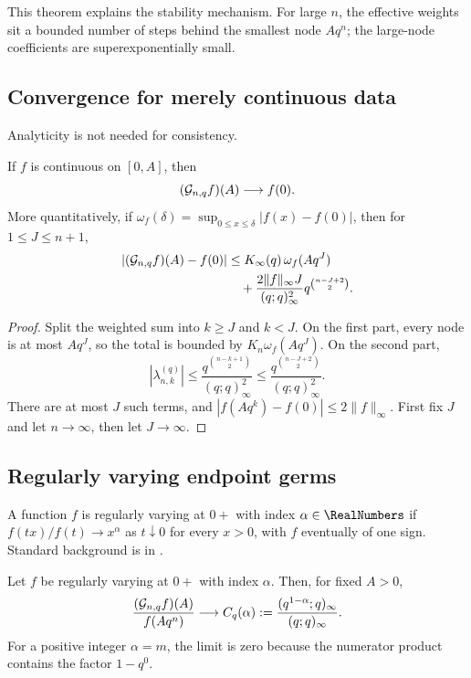 This theorem explains the stability mechanism.  For large $n$, the effective
weights sit a bounded number of steps behind the smallest node $Aq^n$; the
large-node coefficients are superexponentially small.

\subsection{Convergence for merely continuous data}

Analyticity is not needed for consistency.

\begin{theorem}
If $f$ is continuous on $[0,A]$, then
\begin{equation}
 (\mathcal G_{n,q}f)(A)\longrightarrow f(0).
 \label{g1:eq:continuous-convergence}
\end{equation}
More quantitatively, if
$\omega_f(\delta)=\sup_{0\le x\le\delta}|f(x)-f(0)|$, then for
$1\le J\le n+1$,
\begin{align}
 |(\mathcal G_{n,q}f)(A)-f(0)|
 &\le K_\infty(q)\,\omega_f(Aq^J)\notag\\
 &\quad+\frac{2\|f\|_\infty J}{(q;q)_\infty^2}
 q^{\binom{n-J+2}{2}}.
 \label{g1:eq:modulus-bound}
\end{align}
\end{theorem}

\begin{proof}
Split the weighted sum into $k\ge J$ and $k<J$.  On the first part, every node
is at most $Aq^J$, so the total is bounded by $K_n\omega_f(Aq^J)$.  On the
second part,
\[
 |\lambda_{n,k}^{(q)}|
 \le\frac{q^{\binom{n-k+1}{2}}}{(q;q)_\infty^2}
 \le\frac{q^{\binom{n-J+2}{2}}}{(q;q)_\infty^2}.
\]
There are at most $J$ such terms, and
$|f(Aq^k)-f(0)|\le2\|f\|_\infty$.  First fix $J$ and let $n\to\infty$, then let
$J\to\infty$.
\end{proof}

\subsection{Regularly varying endpoint germs}

A function $f$ is regularly varying at $0+$ with index $\alpha\in\RealNumbers$ if
$f(tx)/f(t)\to x^\alpha$ as $t\downarrow0$ for every $x>0$, with $f$ eventually
of one sign.  Standard background is in \cite{BinghamGoldieTeugels}.

\begin{theorem}
Let $f$ be regularly varying at $0+$ with index $\alpha$.  Then, for fixed
$A>0$,
\begin{equation}
 \frac{(\mathcal G_{n,q}f)(A)}{f(Aq^n)}
 \longrightarrow C_q(\alpha):=
 \frac{(q^{1-\alpha};q)_\infty}{(q;q)_\infty}.
 \label{g1:eq:regular-variation}
\end{equation}
For a positive integer $\alpha=m$, the limit is zero because the numerator
product contains the factor $1-q^0$.
\end{theorem}


